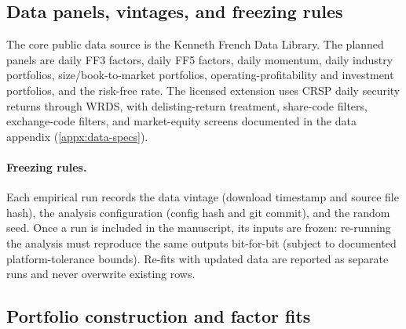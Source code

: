 \begin{table}[p]
\centering

\caption[Empirical design matrix]{Planned
empirical design matrix. Universe, factor model, tail estimator, and
estimator-candidate columns are populated; window and run-status columns
remain \xx{} until populated by the experiment registry. See
\cref{appx:data-specs} for vintage controls.}
\label{tab:empirical-design-matrix-current}
\end{table}

\subsection{Data panels, vintages, and freezing rules}

The core public data source is the Kenneth French Data Library. The planned
panels are daily FF3 factors, daily FF5 factors, daily momentum, daily
industry portfolios, size/book-to-market portfolios,
operating-profitability and investment portfolios, and the risk-free rate.
The licensed extension uses CRSP daily security returns through WRDS, with
delisting-return treatment, share-code filters, exchange-code filters, and
market-equity screens documented in the data appendix
(\cref{appx:data-specs}).

\paragraph{Freezing rules.}
Each empirical run records the data vintage (download timestamp and source
file hash), the analysis configuration (config hash and git commit), and the
random seed. Once a run is included in the manuscript, its inputs are frozen:
re-running the analysis must reproduce the same outputs bit-for-bit (subject
to documented platform-tolerance bounds). Re-fits with updated data are
reported as separate runs and never overwrite existing rows.

\begin{table}[p]
\centering

\caption[Real-data panels]{Real-data panels
and data-vintage controls. All numerical entries are \xx{} until the data
pull is executed. The final version will report date range, number of assets
or portfolios, missingness, source vintage, and access timestamp.}
\label{tab:data-panels}
\end{table}

\subsection{Portfolio construction and factor fits}


